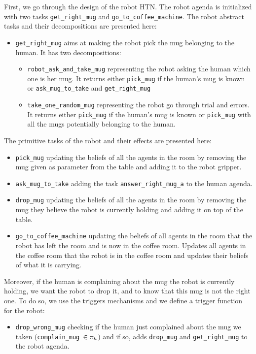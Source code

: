 \documentclass[a4paper,11pt,twoside]{StyleThese}
\begin{document}
First, we go through the design of the robot HTN. The robot agenda is initialized with two tasks \verb'get_right_mug' and \verb'go_to_coffee_machine'. The robot abstract tasks and their decompositions are presented here:
\begin{itemize}
\item \verb'get_right_mug' aims at making the robot pick the mug belonging to the human. It has two decompositions:
	\begin{itemize}
	\item \verb'robot_ask_and_take_mug' representing the robot asking the human which one is her mug. It returns either \verb'pick_mug' if the human's mug is known or \verb'ask_mug_to_take' and \verb'get_right_mug'
	\item \verb'take_one_random_mug' representing the robot go through trial and errors. It returns either \verb'pick_mug' if the human's mug is known or \verb'pick_mug' with all the mugs potentially belonging to the human.
	\end{itemize}
\end{itemize}
The primitive tasks of the robot and their effects are presented here:
\begin{itemize}
\item \verb'pick_mug' updating the beliefs of all the agents in the room by removing the mug given as parameter from the table and adding it to the robot gripper.
\item \verb'ask_mug_to_take' adding the task \verb'answer_right_mug_a' to the human agenda.
\item \verb'drop_mug' updating the beliefs of all the agents in the room by removing the mug they believe the robot is currently holding and adding it on top of the table.
\item \verb'go_to_coffee_machine' updating the beliefs of all agents in the room that the robot has left the room and is now in the coffee room. Updates all agents in the coffee room that the robot is in the coffee room and updates their beliefs of what it is carrying.
\end{itemize}
Moreover, if the human is complaining about the mug the robot is currently holding, we want the robot to drop it, and to know that this mug is not the right one. To do so, we use the triggers mechanisms and we define a trigger function for the robot:
\begin{itemize}
\item \verb'drop_wrong_mug' checking if the human just complained about the mug we taken (\verb'complain_mug'~$\in \pi_h$) and if so, adds \verb'drop_mug' and \verb'get_right_mug' to the robot agenda.
\end{itemize}
\end{document}
